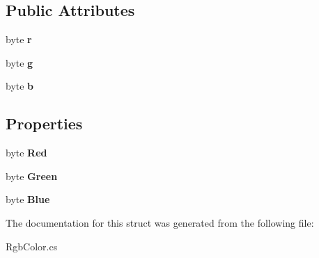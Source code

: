 \subsection*{Public Attributes}
\begin{DoxyCompactItemize}
\item 
\hypertarget{struct_eimu_1_1_core_1_1_rgb_color_a45d7cdb519ca38e7262d3f0bb2bc2a78}{
byte {\bfseries r}}
\label{struct_eimu_1_1_core_1_1_rgb_color_a45d7cdb519ca38e7262d3f0bb2bc2a78}

\item 
\hypertarget{struct_eimu_1_1_core_1_1_rgb_color_a3ddd3ca40b921a39051be5526d8754d6}{
byte {\bfseries g}}
\label{struct_eimu_1_1_core_1_1_rgb_color_a3ddd3ca40b921a39051be5526d8754d6}

\item 
\hypertarget{struct_eimu_1_1_core_1_1_rgb_color_a2575ebbce9e32fdb304deaa0fb320622}{
byte {\bfseries b}}
\label{struct_eimu_1_1_core_1_1_rgb_color_a2575ebbce9e32fdb304deaa0fb320622}

\end{DoxyCompactItemize}
\subsection*{Properties}
\begin{DoxyCompactItemize}
\item 
\hypertarget{struct_eimu_1_1_core_1_1_rgb_color_afd41fee1fa7fbe029cccdef86ec31396}{
byte {\bfseries Red}}
\label{struct_eimu_1_1_core_1_1_rgb_color_afd41fee1fa7fbe029cccdef86ec31396}

\item 
\hypertarget{struct_eimu_1_1_core_1_1_rgb_color_aea47f6a57f793c565c301fa76c06203e}{
byte {\bfseries Green}}
\label{struct_eimu_1_1_core_1_1_rgb_color_aea47f6a57f793c565c301fa76c06203e}

\item 
\hypertarget{struct_eimu_1_1_core_1_1_rgb_color_ae12d1e1527572373016f6900e1b44181}{
byte {\bfseries Blue}}
\label{struct_eimu_1_1_core_1_1_rgb_color_ae12d1e1527572373016f6900e1b44181}

\end{DoxyCompactItemize}


The documentation for this struct was generated from the following file:\begin{DoxyCompactItemize}
\item 
RgbColor.cs\end{DoxyCompactItemize}
